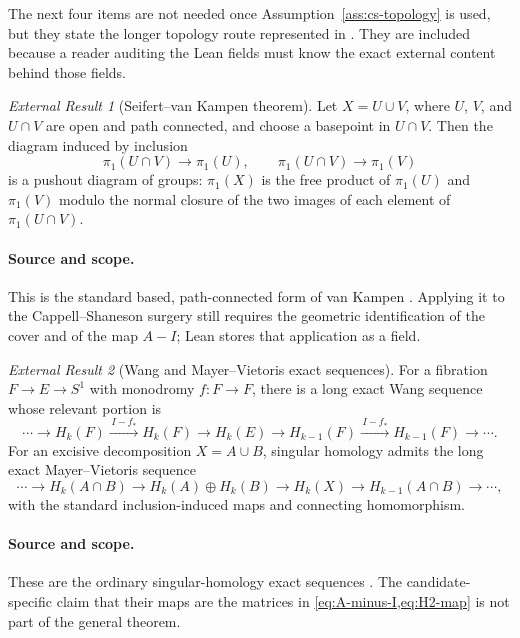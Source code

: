 \documentclass[10pt,reqno]{amsart}
\theoremstyle{definition}
\theoremstyle{remark}
\newtheorem{externalresult}{External Result}
\begin{document}
The next four items are not needed once Assumption~\ref{ass:cs-topology} is
used, but they state the longer topology route represented in
.  They are included because a reader auditing the
Lean fields must know the exact external content behind those fields.

\begin{externalresult}[Seifert--van Kampen theorem]\label{prop:van-kampen}
Let $X=U\cup V$, where $U$, $V$, and $U\cap V$ are open and path connected,
and choose a basepoint in $U\cap V$.  Then the diagram induced by inclusion
\[
\pi_1(U\cap V)\longrightarrow\pi_1(U),
\qquad
\pi_1(U\cap V)\longrightarrow\pi_1(V)
\]
is a pushout diagram of groups: $\pi_1(X)$ is the free product of
$\pi_1(U)$ and $\pi_1(V)$ modulo the normal closure of the two images of each
element of $\pi_1(U\cap V)$.
\end{externalresult}

\paragraph{Source and scope.}
This is the standard based, path-connected form of van Kampen
\cite[Section~1.2]{Hatcher2002}.  Applying it to the Cappell--Shaneson surgery
still requires the geometric identification of the cover and of the map
$A-I$; Lean stores that application as a field.

\begin{externalresult}[Wang and Mayer--Vietoris exact sequences]\label{prop:wang-mv}
For a fibration $F\to E\to S^1$ with monodromy $f:F\to F$, there is a long
exact Wang sequence whose relevant portion is
\[
\cdots\to H_k(F)\xrightarrow{\,I-f_*\,}H_k(F)
\longrightarrow H_k(E)\longrightarrow
H_{k-1}(F)\xrightarrow{\,I-f_*\,}H_{k-1}(F)\to\cdots.
\]
For an excisive decomposition $X=A\cup B$, singular homology admits the long
exact Mayer--Vietoris sequence
\[
\cdots\to H_k(A\cap B)\to H_k(A)\oplus H_k(B)
\to H_k(X)\to H_{k-1}(A\cap B)\to\cdots,
\]
with the standard inclusion-induced maps and connecting homomorphism.
\end{externalresult}

\paragraph{Source and scope.}
These are the ordinary singular-homology exact sequences
\cite[Sections~2.2 and 4.2]{Hatcher2002}.  The candidate-specific claim that
their maps are the matrices in \cref{eq:A-minus-I,eq:H2-map} is not part of
the general theorem.
\end{document}
